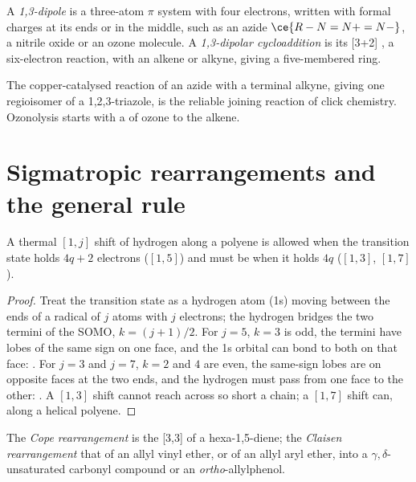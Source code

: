 \begin{definition}\label{def:b3:pericyclic:dipolar}
A \emph{1,3-dipole} is a three-atom $\pi$ system with four
electrons, written with formal charges at its ends or in the middle, such as an
azide $\ce{R-N=N+=N-}$, a nitrile oxide or an ozone molecule. A \emph{1,3-dipolar
cycloaddition} is its [3+2] , a
six-electron reaction, with an alkene or alkyne, giving a five-membered ring.
\end{definition}

The copper-catalysed reaction of an azide with a terminal alkyne, giving one
regioisomer of a 1,2,3-triazole, is the reliable joining reaction of click
chemistry. Ozonolysis starts with a  of ozone to the
alkene.

\section{Sigmatropic rearrangements and the general rule}

\begin{proposition}\label{prop:b3:pericyclic:sigmatropic-h}
A thermal $[1, j]$ shift of hydrogen along a polyene is allowed  when the
transition state holds $4q + 2$ electrons ($[1,5]$) and must be  when it holds $4q$
($[1,3]$, $[1,7]$).
\end{proposition}

\begin{proof}
Treat the transition state as a hydrogen atom (1s) moving between the ends of a
radical of $j$ atoms with $j$ electrons; the hydrogen bridges the two termini of the
SOMO, $k = (j + 1)/2$. For $j = 5$, $k = 3$ is odd, the termini have lobes of the same sign on one face,
and the 1s orbital can bond to both on that face: . For $j = 3$ and $j = 7$,
$k = 2$ and $4$ are even, the same-sign lobes are on opposite faces at the two ends, and
the hydrogen must pass from one face to the other: . A $[1,3]$ shift
cannot reach across so short a chain; a $[1,7]$ shift can, along a helical polyene.
\end{proof}

\begin{definition}\label{def:b3:pericyclic:cope-claisen}
The \emph{Cope rearrangement} is the [3,3]  of a hexa-1,5-diene; the \emph{Claisen
rearrangement} that of an allyl vinyl ether, or of
an allyl aryl ether, into a $\gamma,\delta$-unsaturated carbonyl compound or an \textit{ortho}-allylphenol.
\end{definition}


